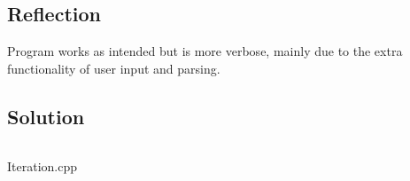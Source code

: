     \subsection*{Reflection}
        Program works as intended but is more verbose, mainly due to the extra functionality
        of user input and parsing.
        
    \subsection*{Solution}
        \begin{listing}[H]
            \inputminted{cpp}{../Tasks/05-Iteration/Iteration.cpp}
            \caption{Iteration.cpp}
        \end{listing}